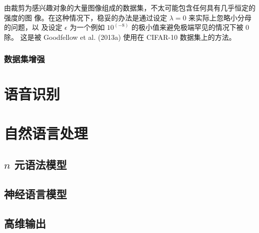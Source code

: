 由裁剪为感兴趣对象的大量图像组成的数据集，不太可能包含任何具有几乎恒定的强度的图
像。在这种情况下，稳妥的办法是通过设定 $\lambda = 0$ 来实际上忽略小分母的问题，以
及设定 $\epsilon$ 为一个例如 $10^{(-8)}$ 的极小值来避免极端罕见的情况下被 $0$ 除。
这是被 Goodfellow et al. (2013a) 使用在 CIFAR-10 数据集上的方法。

\subsubsection{数据集增强}
\label{subsubsec:dataset_augmentation}

\section{语音识别}
\label{sec:speech_recognition}

\section{自然语言处理}
\label{sec:natural_language_processing}

\subsection{$n$ 元语法模型}
\label{subsec:ngrams}

\subsection{神经语言模型}
\label{subsec:neural_language_models}

\subsection{高维输出}
\label{high_dimentional_outputs}

